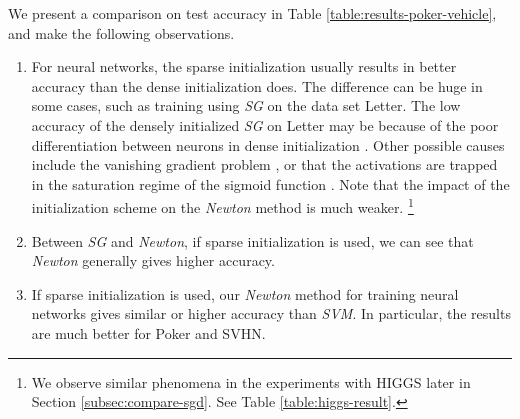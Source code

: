 \documentclass[12pt]{article}
\begin{document}
\par We present a comparison on test accuracy in Table \ref{table:results-poker-vehicle}, and make the following observations. 
\begin{enumerate}[1.]
\item For neural networks, the sparse initialization usually results in better accuracy than the dense initialization does. The difference can be huge in some cases, such as training using {\sl SG} on the data set {\sf Letter}. The low accuracy of the densely initialized {\sl SG} on {\sf Letter} may be because of the poor differentiation between neurons in dense initialization \citep{JM10a}. Other possible causes include the vanishing gradient problem \citep{YB94a}, or that the activations are trapped in the saturation regime of the sigmoid function \citep{XG10a}. Note that the impact of the initialization scheme on the {\sl Newton} method is much weaker.%
\footnote{We observe similar phenomena in the experiments with {\sf HIGGS} later in Section \ref{subsec:compare-sgd}. See Table \ref{table:higgs-result}.}









\item
    Between {\sl SG} and {\sl Newton}, if sparse initialization is used, we can see that {\sl Newton} generally gives higher accuracy.
\item 
If sparse initialization is used, our {\sl Newton} method for training neural networks gives similar or higher accuracy than {\sl SVM}.
In particular, the results are much better for {\sf Poker} and {\sf SVHN}.
\end{enumerate}
\end{document}
